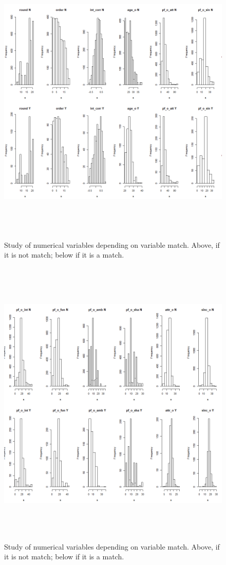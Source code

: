 \begin{figure}
  \centering
  \includegraphics[width= 16cm, height=14cm]{images/profiling/CPG_match_numerical_round_pfosin.png}
  \caption{Study of numerical variables depending on variable match. Above, if it is not match; below if it is a match.}
  \label{fig:indiv}
\end{figure}

\begin{figure}
  \centering
  \includegraphics[width= 16cm, height=14cm]{images/profiling/CPG_match_numerical_pfoint_sinco.png}
  \caption{Study of numerical variables depending on variable match. Above, if it is not match; below if it is a match.}
  \label{fig:indiv}
\end{figure}

